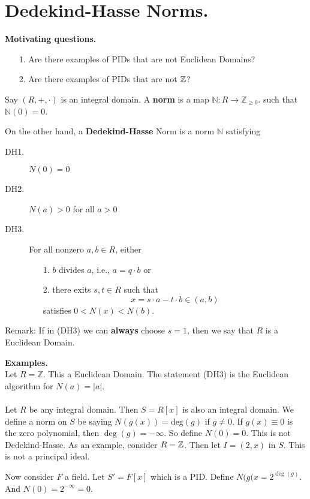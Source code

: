 \section*{Dedekind-Hasse Norms.}
\textbf{Motivating questions.}
\begin{itemize}
    \item[1.] Are there examples of PIDs that are not Euclidean Domains?
    \item[2.] Are there examples of PIDs that are not $\mathbb{Z}$?  
\end{itemize}

Say $(R, +, \cdot)$ is an integral domain. A \textbf{norm} is a
map $\mathbb{N} : R \to \mathbb{Z}_{\ge 0}$. such that
$\mathbb{N}(0) = 0$.

On the other hand, a \textbf{Dedekind-Hasse} Norm is a norm
$\mathbb{N}$ satisfying 
\begin{description}
    \item[DH1.] ${N}(0) = 0$
    \item[DH2.] $N(a) > 0$ for all $a > 0$
    \item[DH3.] For all nonzero $a, b \in R$, either 
    \begin{itemize}
        \item[1.] $b$ divides $a$, i.e., $a = q \cdot b$ or 
        \item[2.] there exits $s, t \in R$ such that 
        \[
            x = s \cdot a -  t \cdot b \in  (a , b) 
        \]  
        satisfies $0 < N(x) < N(b)$.
    \end{itemize}   
\end{description}
Remark: If in (DH3) we can \textbf{always} choose $s = 1$, then we
say that $R$ is a Euclidean Domain.

\textbf{Examples.}\\
Let $R = \mathbb{Z}$. This a Euclidean Domain. The statement (DH3)
is the Euclidean algorithm for $N(a) = |a|$.
\\
\\
Let $R$ be any integral domain. Then $S = R[x]$ is also an
integral domain. We define a norm on $S$ be saying $N(g(x)) =
\text{deg}(g)$ if $g \ne 0$. If $g(x) \equiv 0$ is the zero
polynomial, then $\deg(g) = -\infty$. So define $N(0) = 0$. This
is not Dedekind-Hasse. As an example, consider $R = \mathbb{Z}$. Then let
$I =(2, x)$ in $S$. This is not a principal ideal.

Now consider $F$ a field. Let $S' = F[x]$ which is a PID. Define
$N(g(x= 2^{\deg(g)}$. And $N(0) = 2^{-\infty} = 0$.

